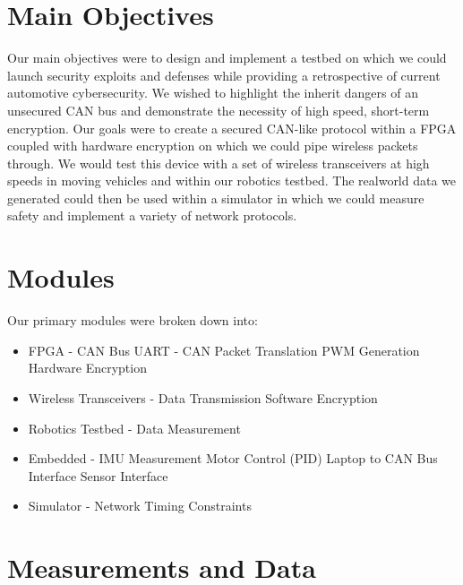 \documentclass[a0,landscape]{a0poster}
\begin{document}
\begin{multicols}{3}
\section*{Main Objectives}
Our main objectives were to design and implement a testbed on which we could launch security exploits and defenses while providing a retrospective of current automotive cybersecurity. We wished to highlight the inherit dangers of an unsecured CAN bus and demonstrate the necessity of high speed, short-term encryption. Our goals were to create a secured CAN-like protocol within a FPGA coupled with hardware encryption on which we could pipe wireless packets through. We would test this device with a set of wireless transceivers at high speeds in moving vehicles and within our robotics testbed. The realworld data we generated could then be used within a simulator in which we could measure safety and implement a variety of network protocols.

\section*{Modules}

Our primary modules were broken down into: 

\begin{multicols}{2}
\begin{itemize}
\item FPGA -
\subitem CAN Bus
\subitem UART - CAN Packet Translation
\subitem PWM Generation
\subitem Hardware Encryption
\item Wireless Transceivers -
\subitem Data Transmission
\subitem Software Encryption
\item Robotics Testbed -
\subitem Data Measurement
\item Embedded -
\subitem IMU Measurement
\subitem Motor Control (PID)
\subitem Laptop to CAN Bus Interface
\subitem Sensor Interface
\item Simulator -
\subitem Network Timing Constraints
\end{itemize}
\end{multicols}
	
\section*{Measurements and Data}


\end{multicols}
\end{document}
